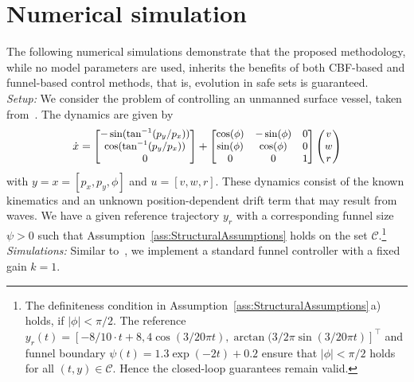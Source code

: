 \documentclass[journal,twoside,web]{ieeeconf}
\begin{document}
\section{Numerical simulation}
\label{Sec:num}
The following numerical simulations demonstrate that the proposed methodology, while no model parameters are used, inherits the benefits of both CBF-based and funnel-based control methods, that is, evolution in safe sets is guaranteed.\\
\textit{Setup:} 
We consider the problem of controlling an unmanned surface vessel, taken from~\cite{namerikawa2024equivalence}.
The dynamics are given by
\begin{align*}
\dot{x}=
\begin{small}
\begin{bmatrix}
-\sin(\tan^{-1}(p_y/p_x)) \\
\cos(\tan^{-1}(p_y/p_x)) \\
0
\end{bmatrix}
\end{small}
+ 
\begin{small}
\begin{bmatrix}
    \cos(\phi) & -\sin(\phi) & 0 \\
    \sin(\phi) & \cos(\phi) & 0 \\
    0&0&1
\end{bmatrix}
\end{small}
\begin{small}
\begin{pmatrix}
    v \\ w \\ r
\end{pmatrix}
\end{small}
\end{align*}
with $y=x=[p_x,p_y,\phi]$ and  $u=[v,w,r]$. These dynamics consist of the known kinematics and an unknown position-dependent drift term that may result from waves.
We have a given reference trajectory $y_r$ with a corresponding funnel size $\psi>0$ such that Assumption~\ref{ass:StructuralAssumptions} holds on the set $\mathcal{C}$.\footnote{%
The definiteness condition in Assumption~\ref{ass:StructuralAssumptions}\,a)  holds, if $|\phi|<\pi/2$. 
 The reference $y_r(t)=[-8/10\cdot t+8,4\cos(3/20\pi t),\arctan(3/2\pi\sin(3/20\pi t)]^\top$ and funnel boundary $\psi(t)=1.3\exp(-2t)+0.2$ ensure that $|\phi|<\pi/2$ holds for all $(t,y)\in\mathcal{C}$. Hence the closed-loop guarantees remain valid.}  
\\ \textit{Simulations: }
Similar to~\cite{namerikawa2024equivalence}, we implement a standard funnel controller with a fixed gain $k=1$. 
\end{document}
